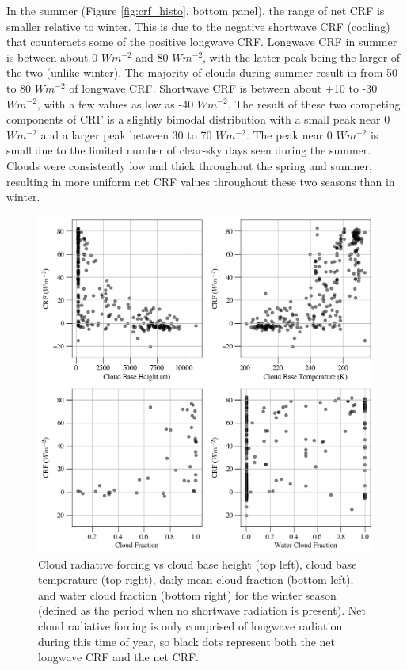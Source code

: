 In the summer (Figure \ref{fig:crf_histo}, bottom panel), the range of net CRF is smaller relative to winter. This is due to the negative shortwave CRF (cooling) that counteracts some of the positive longwave CRF. Longwave CRF in summer is between about 0 $Wm^{-2}$ and 80 $Wm^{-2}$, with the latter peak being the larger of the two (unlike winter). The majority of clouds during summer result in from 50 to 80 $Wm^{-2}$ of longwave CRF. Shortwave CRF is between about +10 to -30 $Wm^{-2}$, with a few values as low as -40 $Wm^{-2}$. The result of these two competing components of CRF is a slightly bimodal distribution with a small peak near 0 $Wm^{-2}$ and a larger peak between 30 to 70 $Wm^{-2}$. The peak near 0 $Wm^{-2}$ is small due to the limited number of clear-sky days seen during the summer. Clouds were consistently low and thick throughout the spring and summer, resulting in more uniform net CRF values throughout these two seasons than in winter.

\begin{figure}[p]
    \centering
    \includegraphics[width=1\linewidth]{figures/chapter4/VSWinter.png}
    \caption[Cloud radiative forcing vs cloud base height, cloud base temperature, cloud fraction, and water cloud fraction for winter.]{Cloud radiative forcing vs cloud base height (top left), cloud base temperature (top right), daily mean cloud fraction (bottom left), and water cloud fraction (bottom right) for the winter season (defined as the period when no shortwave radiation is present). Net cloud radiative forcing is only comprised of longwave radiation during this time of year, so black dots represent both the net longwave CRF and the net CRF.}
    \label{fig:winter:crf}
\end{figure}

